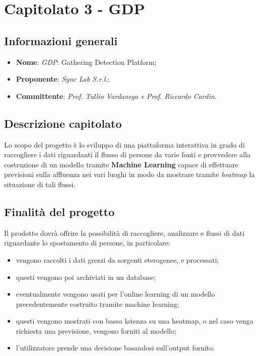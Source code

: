 \section{Capitolato 3 - GDP}
\subsection{Informazioni generali}
\begin{itemize}
    \item \textbf{Nome}: \emph{GDP}: Gathering Detection Platform;
    \item \textbf{Proponente}: \emph{Sync Lab S.r.l.};
    \item \textbf{Committente}: \emph{Prof. Tullio Vardanega e Prof. Riccardo Cardin}.
\end{itemize}
\subsection{Descrizione capitolato}
Lo scopo del progetto è lo sviluppo di una piattaforma interattiva in grado di raccogliere i dati riguardanti il flusso di persone da varie fonti e provvedere alla costruzione di un modello tramite \textbf{Machine Learning} capace di effettuare previsioni sulla affluenza nei vari luoghi in modo da mostrare tramite \emph{heatmap} la situazione di tali flussi.
\subsection{Finalità del progetto}
Il prodotto dovrà offrire la possibilità di raccogliere, analizzare e flussi di dati riguardante lo spostamento di persone, in particolare:
\begin{itemize}
    \item vengono raccolti i dati grezzi da sorgenti eterogenee, e processati;
    \item questi vengono poi archiviati in un database;
    \item eventualmente vengono usati per l'online learning di un modello precedentemente costruito tramite machine learning;
    \item questi vengono mostrati con bassa latenza su una heatmap, o nel caso venga richiesta una previsione, vengono forniti al modello;
    \item l'utilizzatore prende una decisione basandosi sull'output fornito.
\end{itemize}

